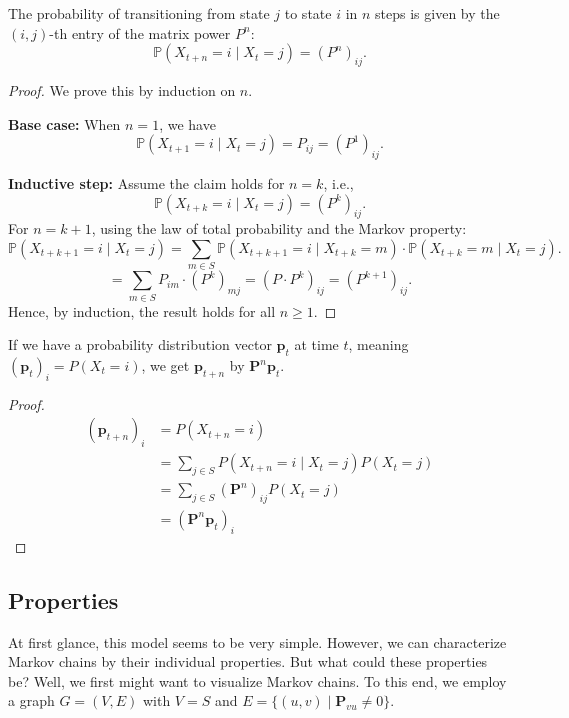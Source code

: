 \documentclass[../../main.tex]{subfiles}
\begin{document}
\begin{lemma}
The probability of transitioning from state $j$ to state $i$ in $n$ steps is given by the $(i,j)$-th entry of the matrix power $P^n$:
\[
\mathbb{P}(X_{t+n} = i \mid X_t = j) = (P^n)_{ij}.
\]
\end{lemma}

\begin{proof}
We prove this by induction on \( n \).

\textbf{Base case:} When \( n = 1 \), we have
\[
\mathbb{P}(X_{t+1} = i \mid X_t = j) = P_{ij} = (P^1)_{ij}.
\]

\textbf{Inductive step:} Assume the claim holds for \( n = k \), i.e.,
\[
\mathbb{P}(X_{t+k} = i \mid X_t = j) = (P^k)_{ij}.
\]
For \( n = k+1 \), using the law of total probability and the Markov property:
\[
\mathbb{P}(X_{t+k+1} = i \mid X_t = j) = \sum_{m \in S} \mathbb{P}(X_{t+k+1} = i \mid X_{t+k} = m) \cdot \mathbb{P}(X_{t+k} = m \mid X_t = j).
\]
\[
= \sum_{m \in S} P_{im} \cdot (P^k)_{mj} = (P \cdot P^k)_{ij} = (P^{k+1})_{ij}.
\]
Hence, by induction, the result holds for all \( n \geq 1 \).
\end{proof}

\begin{lemma}
    If we have a probability distribution vector $\bm{p}_t$ at time $t$, meaning $(\bm{p}_t)_i = P(X_t = i)$, we get $\bm{p}_{t+n}$ by $\bm{P}^n \bm{p}_t$.
\end{lemma}
\vspace{-2.5em}
\begin{proof}
    \begin{align*}
        (\bm{p}_{t+n})_i &= P(X_{t+n} = i) \\
        &= \sum_{j \in S} P(X_{t+n} = i \mid X_t = j) P(X_t = j) \\
        &= \sum_{j \in S} (\bm{P}^n)_{ij} P(X_t = j) \\
        &= (\bm{P}^n \bm{p}_t)_i
    \end{align*}
\end{proof}


\subsection{Properties}
At first glance, this model seems to be very simple. However, we can characterize Markov chains by their individual properties. But what could these properties be? Well, we first might want to visualize Markov chains. To this end, we employ a graph $G = (V, E)$ with $V = S$ and $E = \{(u, v) \mid \bm{P}_{vu} \neq 0\}$.
\end{document}
